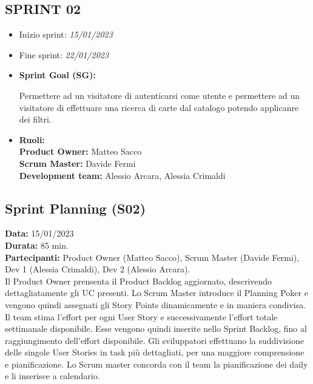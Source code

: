 \documentclass[a4paper, oneside]{article}
\newcommand\due{Scrum Master (Davide Fermi), Dev 1 (Alessia Crimaldi), Dev 2 (Alessio Arcara).}
\newcommand\dueP{Product Owner (Matteo Sacco), }
\begin{document}
\begin{landscape}
        \section{SPRINT 02}
        \begin{itemize}
            \item Inizio sprint: \textit{15/01/2023}
            \item Fine sprint: \textit{22/01/2023}
        \end{itemize}
        \begin{itemize}
            \item \textbf{Sprint Goal (SG):}\\
            \begin{indent}
                \newline Permettere ad un visitatore di autenticarsi come utente e permettere ad un visitatore di effettuare una ricerca di carte dal catalogo potendo applicanre dei filtri.\\
            \end{indent}
        \end{itemize}
        \begin{itemize}
            \item \textbf{Ruoli:}\\
            \textbf{Product Owner:} Matteo Sacco \\
            \textbf{Scrum Master:} Davide Fermi \\
            \textbf{Development team:} Alessio Arcara, Alessia Crimaldi \\
        \end{itemize}
        \vspace{2mm} %
        \subsection{Sprint Planning (S02)}
        \textbf{Data:} 15/01/2023 \\
        \textbf{Durata:} 85 min. \\
        \textbf{Partecipanti:} \dueP \due \\
        \newline Il Product Owner prensenta il Product Backlog aggiornato, descrivendo dettagliatamente gli UC presenti. Lo Scrum Master introduce il Planning Poker e vengono quindi assegnati gli Story Points dinamicamente e in maniera condivisa.  Il team stima l'effort per ogni User Story e successivamente l'effort totale settimanale disponibile. Esse vengono quindi inserite nello Sprint Backlog, fino al raggiungimento dell'effort disponibile.  Gli sviluppatori effettuano la suddivisione delle singole User Stories in task più dettagliati, per una maggiore comprensione e pianificazione. Lo Scrum master concorda con il team la pianificazione dei daily e li inserisce a calendario.


\end{landscape}
\end{document}

